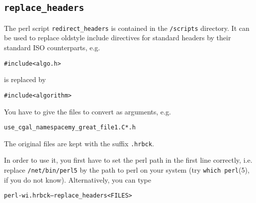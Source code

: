 \subsection{\texttt{replace\_headers}}\label{sec:replace_headers}

The perl script \texttt{redirect\_headers} is contained in the
\cgaldir\texttt{/scripts} directory. It can be used to replace
oldstyle include directives for standard headers by their standard ISO
counterparts, e.g.
\begin{alltt}
  #include <algo.h>
\end{alltt}
is replaced by
\begin{alltt}
  #include <algorithm>
\end{alltt}
You have to give the files to
convert as arguments, e.g.
\begin{alltt}
  use_cgal_namespace my_great_file1.C *.h
\end{alltt}
The original files are kept with the suffix \texttt{.hrbck}.

In order to use it, you first have to set the perl path in the first
line correctly, i.e. replace \texttt{/net/bin/perl5} by the path to
perl on your system (try \texttt{which perl}(5), if you do not know).
Alternatively, you can type
\begin{alltt}
  perl -wi.hrbck -- replace_headers <FILES>
\end{alltt}

